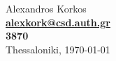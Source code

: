 \begin{titlepage}
    \vspace*{\fill}
    
    \begin{center}
        Alexandros Korkos \\
        \textbf{\href{mailto:alexkork@csd.auth.gr}{alexkork@csd.auth.gr}}\\
        \textbf{3870}
        \Rule \\[0.4cm]
        Thessaloniki, \today
    \end{center}
    
\end{titlepage}